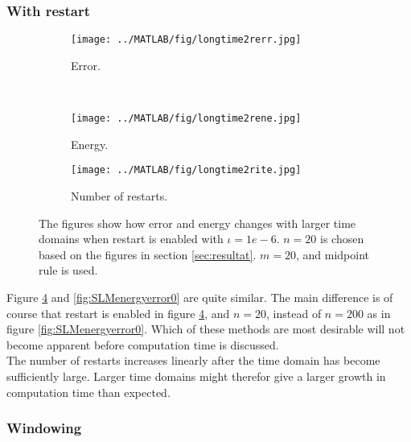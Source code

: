 \subsubsection{With restart} %
\begin{figure}[H]
        \centering
        \begin{subfigure}[b]{0.45\textwidth}
                \texttt{[image: ../MATLAB/fig/longtime2rerr.jpg]}
                \caption{ Error. }
                \label{fig:longtime2rerr}
        \end{subfigure}
        ~
        \begin{subfigure}[b]{0.45\textwidth}
                \texttt{[image: ../MATLAB/fig/longtime2rene.jpg]}
                \caption{ Energy. }
                \label{fig:longtime8rerr}
        \end{subfigure}
     
        
        \begin{subfigure}[b]{0.45\textwidth}
                \texttt{[image: ../MATLAB/fig/longtime2rite.jpg]}
                \caption{ Number of restarts. }
                \label{fig:longtime2rene}
        \end{subfigure}
        \caption{ The figures show how error and energy changes with larger time domains when restart is enabled with $\iota = 1e-6$. $n = 20$ is chosen based on the figures in section \ref{sec:resultat}. $m = 20$, and midpoint rule is used. }
        \label{fig:SLMenergyerror1}
\end{figure}
Figure \ref{fig:SLMenergyerror1} and \ref{fig:SLMenergyerror0} are quite similar. The main difference is of course that restart is enabled in figure \ref{fig:SLMenergyerror1}, and $n = 20$, instead of $n = 200$ as in figure \ref{fig:SLMenergyerror0}. Which of these methods are most desirable will not become apparent before computation time is discussed. \\
The number of restarts increases linearly after the time domain has become sufficiently large. Larger time domains might therefor give a larger growth in computation time than expected. \\
\subsubsection{Windowing} %

